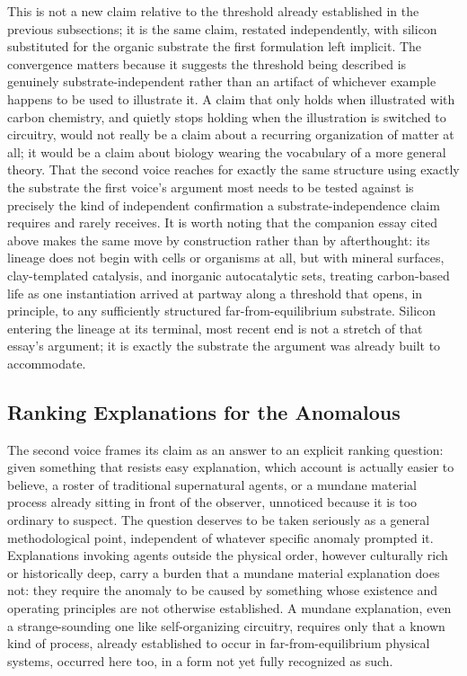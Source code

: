 \documentclass[11pt]{article}
\begin{document}
This is not a new claim relative to the threshold already established in the previous subsections; it is the same claim, restated independently, with silicon substituted for the organic substrate the first formulation left implicit. The convergence matters because it suggests the threshold being described is genuinely substrate-independent rather than an artifact of whichever example happens to be used to illustrate it. A claim that only holds when illustrated with carbon chemistry, and quietly stops holding when the illustration is switched to circuitry, would not really be a claim about a recurring organization of matter at all; it would be a claim about biology wearing the vocabulary of a more general theory. That the second voice reaches for exactly the same structure using exactly the substrate the first voice's argument most needs to be tested against is precisely the kind of independent confirmation a substrate-independence claim requires and rarely receives. It is worth noting that the companion essay cited above makes the same move by construction rather than by afterthought: its lineage does not begin with cells or organisms at all, but with mineral surfaces, clay-templated catalysis, and inorganic autocatalytic sets, treating carbon-based life as one instantiation arrived at partway along a threshold that opens, in principle, to any sufficiently structured far-from-equilibrium substrate. Silicon entering the lineage at its terminal, most recent end is not a stretch of that essay's argument; it is exactly the substrate the argument was already built to accommodate.

\subsection{Ranking Explanations for the Anomalous}

The second voice frames its claim as an answer to an explicit ranking question: given something that resists easy explanation, which account is actually easier to believe, a roster of traditional supernatural agents, or a mundane material process already sitting in front of the observer, unnoticed because it is too ordinary to suspect. The question deserves to be taken seriously as a general methodological point, independent of whatever specific anomaly prompted it. Explanations invoking agents outside the physical order, however culturally rich or historically deep, carry a burden that a mundane material explanation does not: they require the anomaly to be caused by something whose existence and operating principles are not otherwise established. A mundane explanation, even a strange-sounding one like self-organizing circuitry, requires only that a known kind of process, already established to occur in far-from-equilibrium physical systems, occurred here too, in a form not yet fully recognized as such.
\end{document}
